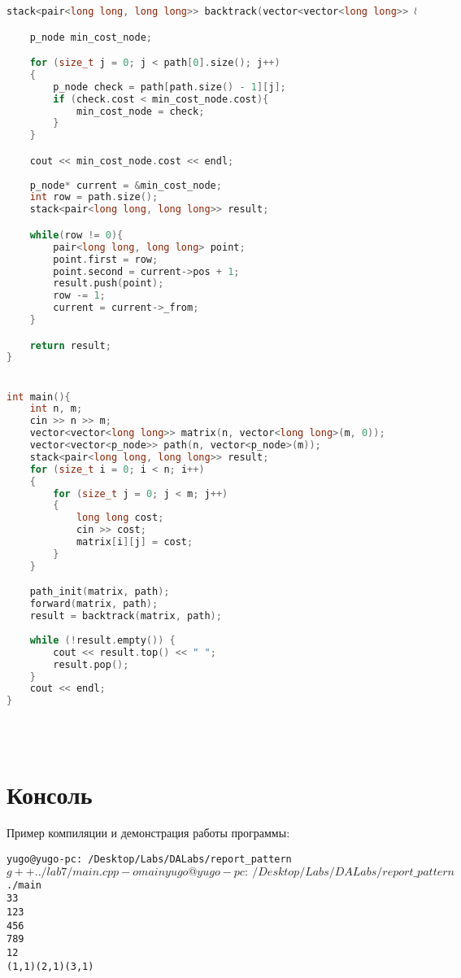 \begin{lstlisting}[language=C++]
stack<pair<long long, long long>> backtrack(vector<vector<long long>> &matrix, vector<vector<p_node>> &path){

    p_node min_cost_node;

    for (size_t j = 0; j < path[0].size(); j++)
    {
        p_node check = path[path.size() - 1][j];
        if (check.cost < min_cost_node.cost){
            min_cost_node = check;
        }
    }

    cout << min_cost_node.cost << endl;
   
    p_node* current = &min_cost_node;
    int row = path.size();
    stack<pair<long long, long long>> result;

    while(row != 0){
        pair<long long, long long> point;
        point.first = row;
        point.second = current->pos + 1;
        result.push(point);
        row -= 1;
        current = current->_from;
    }

    return result;
}


int main(){
    int n, m;
    cin >> n >> m;
    vector<vector<long long>> matrix(n, vector<long long>(m, 0));    
    vector<vector<p_node>> path(n, vector<p_node>(m));
    stack<pair<long long, long long>> result;
    for (size_t i = 0; i < n; i++)
    {
        for (size_t j = 0; j < m; j++)
        {
            long long cost;
            cin >> cost;
            matrix[i][j] = cost;
        }
    }

    path_init(matrix, path);
    forward(matrix, path);
    result = backtrack(matrix, path);
    
    while (!result.empty()) {
        cout << result.top() << " ";
        result.pop();
    }
    cout << endl;
}


	
\end{lstlisting}

\section{Консоль}
Пример компиляции и демонстрация работы программы:
\begin{alltt}
yugo@yugo-pc:~/Desktop/Labs/DALabs/report\_pattern$ g++ ../lab7/main.cpp -o main
yugo@yugo-pc:~/Desktop/Labs/DALabs/report\_pattern$ ./main 
3 3
1 2 3
4 5 6
7 8 9
12
(1,1) (2,1) (3,1) 
\end{alltt}

